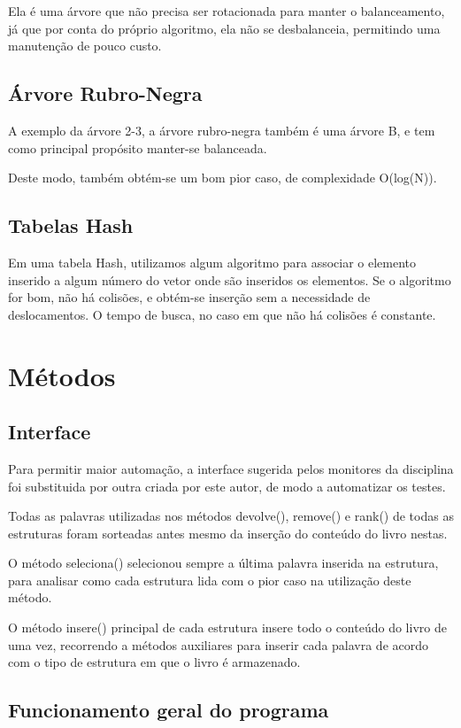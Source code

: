 \documentclass[a4paper]{article}
\begin{document}
Ela é uma árvore que não precisa ser rotacionada para manter o balanceamento, já que por conta do próprio algoritmo, ela não se desbalanceia, permitindo uma manutenção de pouco custo.

\subsection{Árvore Rubro-Negra}
A exemplo da árvore 2-3, a árvore rubro-negra também é uma árvore B, e tem como principal propósito manter-se balanceada.

Deste modo, também obtém-se um bom pior caso, de complexidade O(log(N)).
\subsection{Tabelas Hash}
Em uma tabela Hash, utilizamos algum algoritmo para associar o elemento inserido a algum número do vetor onde são inseridos os elementos.
Se o algoritmo for bom, não há colisões, e obtém-se inserção sem a necessidade de deslocamentos.
O tempo de busca, no caso em que não há colisões é constante.

\section{Métodos}
\subsection{Interface}

Para permitir maior automação, a interface sugerida pelos monitores da disciplina foi substituida por outra criada por este autor, de modo a automatizar os testes.

Todas as palavras utilizadas nos métodos devolve(), remove() e rank() de todas as estruturas foram sorteadas antes mesmo da inserção do conteúdo do livro nestas.

O método seleciona() selecionou sempre a última palavra inserida na estrutura, para analisar como cada estrutura lida com o pior caso na utilização deste método.

O método insere() principal de cada estrutura insere todo o conteúdo do livro de uma vez, recorrendo a métodos auxiliares para inserir cada palavra de acordo com o tipo de estrutura em que o livro é armazenado.

\subsection{Funcionamento geral do programa}
\end{document}
